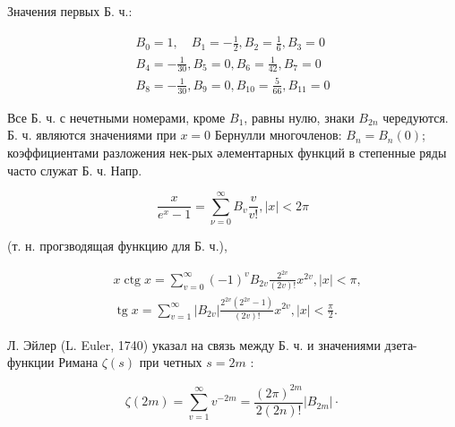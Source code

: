 \documentclass[10pt]{article}
\begin{document}
Значения первых Б. ч.:



\[

\begin{gathered}

B_{0}=1, \quad B_{1}=-\frac{1}{2}, B_{2}=\frac{1}{6}, B_{3}=0 \\

B_{4}=-\frac{1}{30}, B_{5}=0, B_{6}=\frac{1}{42}, B_{7}=0 \\

B_{8}=-\frac{1}{30}, B_{9}=0, B_{10}=\frac{5}{66}, B_{11}=0

\end{gathered}

\]



Все Б. ч. с нечетными номерами, кроме $B_{1}$, равны нулю, знаки $B_{2 n}$ чередуются. Б. ч. являются значениями при $x=0$ Бернулли многочленов: $B_{n}=B_{n}(0)$; коэффициентами разложения нек-рых әлементарных функций в степенные ряды часто служат Б. ч. Напр.



\[

\frac{x}{e^{x}-1}=\sum_{\nu=0}^{\infty} B_{v} \frac{v}{v !},|x|<2 \pi

\]



(т. н. прогзводящая функцию для Б. ч.),



\[

\begin{aligned}

& x \operatorname{ctg} x=\sum_{v=0}^{\infty}(-1)^{v} B_{2 v} \frac{2^{2 v}}{(2 v) !} x^{2 v},|x|<\pi, \\

& \operatorname{tg} x=\sum_{v=1}^{\infty}\left|B_{2 v}\right| \frac{2^{2 v}\left(2^{2 v}-1\right)}{(2 v) !} x^{2 v},|x|<\frac{\pi}{2} .

\end{aligned}

\]



Л. Эйлер (L. Euler, 1740) указал на связь между Б. ч. и значениями дзета-функции Римана $\zeta(s)$ при четных $s=2 m$ :



\[

\zeta(2 m)=\sum_{v=1}^{\infty} v^{-2 m}=\frac{(2 \pi)^{2 m}}{2(2 n) !}\left|B_{2 m}\right| \cdot

\]
\end{document}
